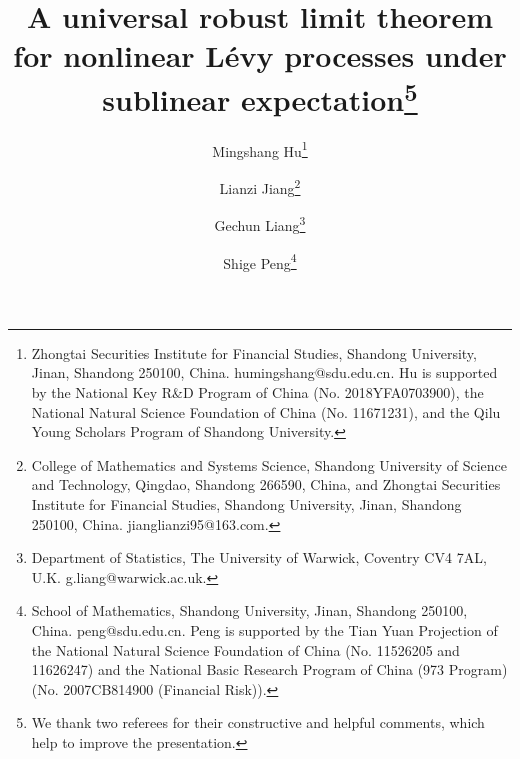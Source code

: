 \documentclass[a4paper,oneside,10pt]{article}%
\numberwithin{equation}{section}
\begin{document}
\title{A universal robust limit theorem for nonlinear L\'evy processes under
sublinear expectation\thanks{We thank two referees for their constructive and
helpful comments, which help to improve the presentation.}}
\author{Mingshang Hu\thanks{Zhongtai Securities Institute for Financial Studies,
Shandong University, Jinan, Shandong 250100, China. humingshang@sdu.edu.cn. Hu
is supported by the National Key R\&D Program of China (No. 2018YFA0703900),
the National Natural Science Foundation of China (No. 11671231), and the Qilu
Young Scholars Program of Shandong University. }
\and Lianzi Jiang\thanks{College of Mathematics and Systems Science, Shandong
University of Science and Technology, Qingdao, Shandong 266590, China, and
Zhongtai Securities Institute for Financial Studies, Shandong University,
Jinan, Shandong 250100, China. jianglianzi95@163.com.}
\and Gechun Liang\thanks{Department of Statistics, The University of Warwick,
Coventry CV4 7AL, U.K. g.liang@warwick.ac.uk.}
\and Shige Peng\thanks{School of Mathematics, Shandong University, Jinan, Shandong
250100, China. peng@sdu.edu.cn. Peng is supported by the Tian Yuan Projection
of the National Natural Science Foundation of China (No. 11526205 and
11626247) and the National Basic Research Program of China (973 Program) (No.
2007CB814900 (Financial Risk)).} }
\date{}
\maketitle
\end{document}
